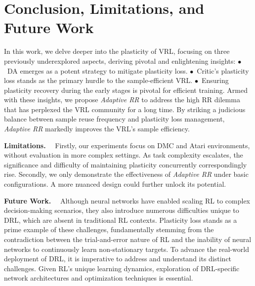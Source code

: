 \section{\textbf{Conclusion, Limitations, and Future Work}}

\vspace{-0.5\baselineskip}
In this work, we delve deeper into the plasticity of VRL, focusing on three previously underexplored aspects, deriving pivotal and enlightening insights:
\textcolor{mydarkgreen}{$\bullet$}~DA emerges as a potent strategy to mitigate plasticity loss.
\textcolor{mydarkgreen}{$\bullet$}~Critic's plasticity loss stands as the primary hurdle to the sample-efficient VRL.
\textcolor{mydarkgreen}{$\bullet$}~Ensuring plasticity recovery during the early stages is pivotal for efficient training.
Armed with these insights, we propose \textit{Adaptive RR} to address the high RR dilemma that has perplexed the VRL community for a long time.
By striking a judicious balance between sample reuse frequency and plasticity loss management, \textit{Adaptive RR} markedly improves the VRL's sample efficiency.

\textbf{Limitations.}~~
Firstly, our experiments focus on DMC and Atari environments, without evaluation in more complex settings. As task complexity escalates, the significance and difficulty of maintaining plasticity concurrently correspondingly rise. Secondly, we only demonstrate the effectiveness of \textit{Adaptive RR} under basic configurations. A more nuanced design could further unlock its potential.

\textbf{Future Work.}~~
Although neural networks have enabled scaling RL to complex decision-making scenarios, they also introduce numerous difficulties unique to DRL, which are absent in traditional RL contexts.
Plasticity loss stands as a prime example of these challenges, fundamentally stemming from the contradiction between the trial-and-error nature of RL and the inability of neural networks to continuously learn non-stationary targets.
To advance the real-world deployment of DRL, it is imperative to address and understand its distinct challenges.
Given RL's unique learning dynamics, exploration of DRL-specific network architectures and optimization techniques is essential.


